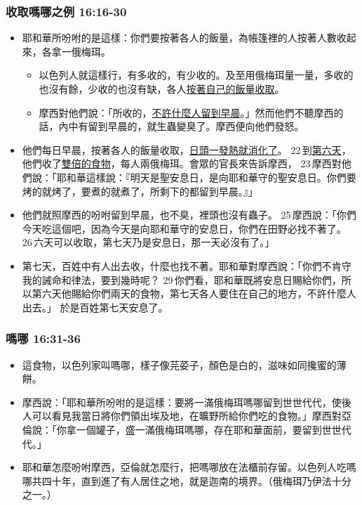 \subsubsection{收取嗎哪之例 16:16-30}
\begin{itemize} 
\itemsep-.35em
\item 耶和華所吩咐的是這樣：你們要按著各人的飯量，為帳篷裡的人按著人數收起來，各拿一俄梅珥。
\begin{itemize} 
\itemsep-.35em
\item 以色列人就這樣行，有多收的，有少收的。及至用俄梅珥量一量，多收的也沒有餘，少收的也沒有缺，各人\underline{按著自己的飯量收取}。 
\item 摩西對他們說：「所收的，\underline{不許什麼人留到早晨}。」然而他們不聽摩西的話，內中有留到早晨的，就生蟲變臭了。摩西便向他們發怒。
\end{itemize}
\item 他們每日早晨，按著各人的飯量收取，\underline{日頭一發熱就消化了}。 22 到\underline{第六天}，他們收了\underline{雙倍的食物}，每人兩俄梅珥。會眾的官長來告訴摩西， 23 摩西對他們說：「耶和華這樣說：『明天是聖安息日，是向耶和華守的聖安息日。你們要烤的就烤了，要煮的就煮了，所剩下的都留到早晨。』」
\item 他們就照摩西的吩咐留到早晨，也不臭，裡頭也沒有蟲子。 25 摩西說：「你們今天吃這個吧，因為今天是向耶和華守的安息日，你們在田野必找不著了。 26 六天可以收取，第七天乃是安息日，那一天必沒有了。」 
\item 第七天，百姓中有人出去收，什麼也找不著。耶和華對摩西說：「你們不肯守我的誡命和律法，要到幾時呢？ 29 你們看，耶和華既將安息日賜給你們，所以第六天他賜給你們兩天的食物，第七天各人要住在自己的地方，不許什麼人出去。」 於是百姓第七天安息了。
\end{itemize}

\subsubsection{嗎哪 16:31-36}
\begin{itemize} 
\itemsep-.35em
\item 這食物，以色列家叫嗎哪，樣子像芫荽子，顏色是白的，滋味如同攙蜜的薄餅。
\item 摩西說：「耶和華所吩咐的是這樣：要將一滿俄梅珥嗎哪留到世世代代，使後人可以看見我當日將你們領出埃及地，在曠野所給你們吃的食物。」摩西對亞倫說：「你拿一個罐子，盛一滿俄梅珥嗎哪，存在耶和華面前，要留到世世代代。」
\item 耶和華怎麼吩咐摩西，亞倫就怎麼行，把嗎哪放在法櫃前存留。以色列人吃嗎哪共四十年，直到進了有人居住之地，就是迦南的境界。（俄梅珥乃伊法十分之一。）
\end{itemize}

